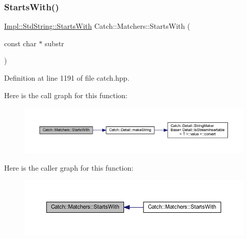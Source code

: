 \subsubsection{\texorpdfstring{Starts\+With()}{StartsWith()}\hspace{0.1cm}{\footnotesize\ttfamily [2/2]}}
{\footnotesize\ttfamily \hyperlink{struct_catch_1_1_matchers_1_1_impl_1_1_std_string_1_1_starts_with}{Impl\+::\+Std\+String\+::\+Starts\+With} Catch\+::\+Matchers\+::\+Starts\+With (\begin{DoxyParamCaption}\item[{const char $\ast$}]{substr }\end{DoxyParamCaption})\hspace{0.3cm}{\ttfamily [inline]}}



Definition at line 1191 of file catch.\+hpp.

Here is the call graph for this function\+:\nopagebreak
\begin{figure}[H]
\begin{center}
\leavevmode
\includegraphics[width=350pt]{namespace_catch_1_1_matchers_a031985c11b8c8bb62585b3904f9fd2b0_cgraph}
\end{center}
\end{figure}
Here is the caller graph for this function\+:\nopagebreak
\begin{figure}[H]
\begin{center}
\leavevmode
\includegraphics[width=350pt]{namespace_catch_1_1_matchers_a031985c11b8c8bb62585b3904f9fd2b0_icgraph}
\end{center}
\end{figure}
